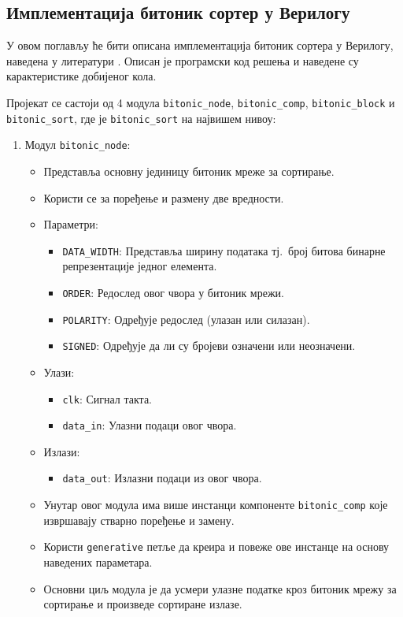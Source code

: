 \documentclass[12pt, a4paper]{article}
\theoremstyle{definition}
\begin{document}
\newpage
\subsection{Имплементација битоник сортер у Верилогу}

У овом поглављу ће бити описана имплементација битоник сортера у Верилогу, наведена у литератури \cite{git_verilog}. Описан је програмски код решења и наведене су карактеристике добијеног кола.

Пројекат се састоји од 4 модула \verb+bitonic_node+, \verb+bitonic_comp+, \verb+bitonic_block+ и \verb+bitonic_sort+, где је \verb+bitonic_sort+ на највишем нивоу:
\begin{enumerate}
 \item Модул \verb+bitonic_node+:
 \begin{itemize}
  \item Представља основну јединицу битоник мреже за сортирање.
  \item Користи се за поређење и размену две вредности.
  \item Параметри:
  \begin{itemize}
   \item \verb+DATA_WIDTH+: Представља ширину података тј.\ број битова бинарне репрезентације једног елемента.
   \item \verb+ORDER+: Редослед овог чвора у битоник мрежи.
   \item \verb+POLARITY+: Одређује редослед (улазан или силазан).
   \item \verb+SIGNED+: Одређује да ли су бројеви означени или неозначени.
  \end{itemize}
  \item Улази:
  \begin{itemize}
   \item \verb+clk+: Сигнал такта.
   \item \verb+data_in+: Улазни подаци овог чвора.
  \end{itemize}
  \item Излази:
  \begin{itemize}
   \item \verb+data_out+: Излазни подаци из овог чвора.
  \end{itemize}
  \item Унутар овог модула има више инстанци компоненте \verb+bitonic_comp+ које извршавају стварно поређење и замену.
  \item Користи \verb+generative+ петље да креира и повеже ове инстанце на основу наведених параметара.
  \item Основни циљ модула је да усмери улазне податке кроз битоник мрежу за сортирање и произведе сортиране излазе.
 \end{itemize}


\end{enumerate}
\end{document}
